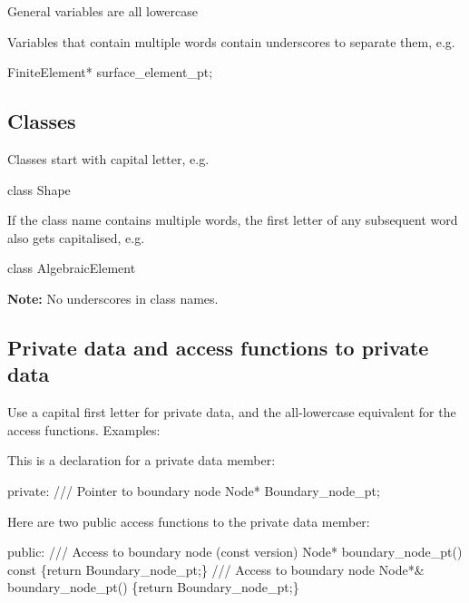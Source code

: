 \begin{DoxyItemize}
\item General variables are all lowercase
\item Variables that contain multiple words contain underscores to separate them, e.\-g. 
\begin{DoxyCode}
FiniteElement* surface\_element\_pt; 
\end{DoxyCode}

\end{DoxyItemize}\hypertarget{index_classes}{}\subsection{Classes}\label{index_classes}

\begin{DoxyItemize}
\item Classes start with capital letter, e.\-g. 
\begin{DoxyCode}
\textcolor{keyword}{class }Shape 
\end{DoxyCode}

\end{DoxyItemize}


\begin{DoxyItemize}
\item If the class name contains multiple words, the first letter of any subsequent word also gets capitalised, e.\-g. 
\begin{DoxyCode}
\textcolor{keyword}{class }AlgebraicElement 
\end{DoxyCode}
 {\bfseries Note\-:} No underscores in class names.
\end{DoxyItemize}\hypertarget{index_private_public}{}\subsection{Private data and access functions to  private data}\label{index_private_public}
Use a capital first letter for private data, and the all-\/lowercase equivalent for the access functions. Examples\-:
\begin{DoxyItemize}
\item This is a declaration for a private data member\-: 
\begin{DoxyCode}
\textcolor{keyword}{private}: 
\textcolor{comment}{}
\textcolor{comment}{  /// Pointer to boundary node}
\textcolor{comment}{}  Node* Boundary\_node\_pt; 
\end{DoxyCode}

\item Here are two public access functions to the private data member\-: 
\begin{DoxyCode}
\textcolor{keyword}{public}: 
\textcolor{comment}{}
\textcolor{comment}{ /// Access to boundary node (const version)}
\textcolor{comment}{} Node* boundary\_node\_pt()\textcolor{keyword}{ const }\{\textcolor{keywordflow}{return} Boundary\_node\_pt;\}
\textcolor{comment}{}
\textcolor{comment}{ /// Access to boundary node}
\textcolor{comment}{} Node*& boundary\_node\_pt() \{\textcolor{keywordflow}{return} Boundary\_node\_pt;\}
\end{DoxyCode}

\end{DoxyItemize}

